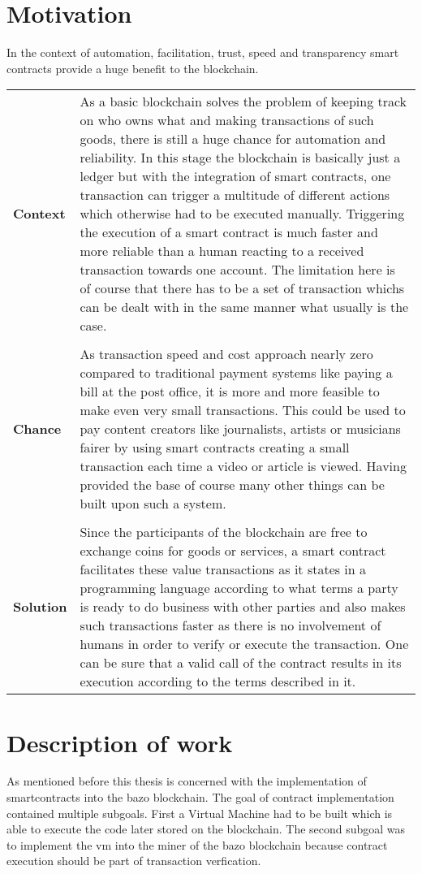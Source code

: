 \section{Motivation}
In the context of automation, facilitation, trust, speed and transparency smart contracts provide a huge benefit to the blockchain.

\begin{tabular}[t]{ p{3cm} p{12.5cm}}
\textbf{Context} & 
As a basic blockchain solves the problem of keeping track on who owns what and making transactions of such goods, there is still a huge chance for automation and reliability. In this stage the blockchain is basically just a ledger but with the integration of smart contracts, one transaction can trigger a multitude of different actions which otherwise had to be executed manually. Triggering the execution of a smart contract is much faster and more reliable than a human reacting to a received transaction towards one account. The limitation here is of course that there has to be a set of transaction whichs can be dealt with in the same manner what usually is the case. \\ \\

\textbf{Chance} & 
As transaction speed and cost approach nearly zero compared to traditional payment systems like paying a bill at the post office, it is more and more feasible to make even very small transactions. This could be used to pay content creators like journalists, artists or musicians fairer by using smart contracts creating a small transaction each time a video or article is viewed.
Having provided the base of course many other things can be built upon such a system.\\ \\

\textbf{Solution} & 
Since the participants of the blockchain are free to exchange coins for goods or services, a smart contract facilitates these value transactions as it states in a programming language according to what terms a party is ready to do business with other parties and also makes such transactions faster as there is no involvement of humans in order to verify or execute the transaction. One can be sure that a valid call of the contract results in its execution according to the terms described in it.
\end{tabular}

\section{Description of work}
As mentioned before this thesis is concerned with the implementation of smartcontracts into the bazo blockchain. The goal of contract implementation contained multiple subgoals. First a Virtual Machine had to be built which is able to execute the code later stored on the blockchain. The second subgoal was to implement the vm into the miner of the bazo blockchain because contract execution should be part of transaction verfication.
